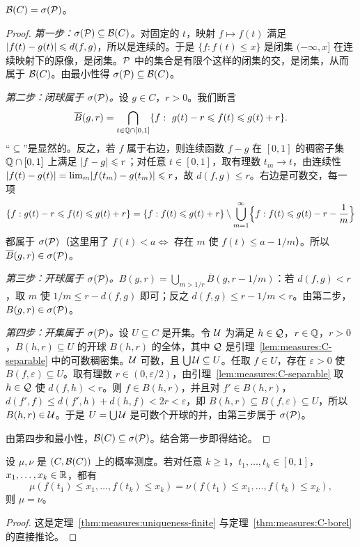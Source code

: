 \begin{theorem}\label{thm:measures:C-borel}
$\mathcal{B}(C)=\sigma(\mathcal{P})$。
\end{theorem}
\begin{proof}
\emph{第一步：$\sigma(\mathcal{P})\subseteq\mathcal{B}(C)$。}对固定的 $t$，映射 $f\mapsto f(t)$ 满足 $\lvert f(t)-g(t)\rvert\leqslant d(f,g)$，所以是连续的。于是 $\{f:f(t)\leqslant x\}$ 是闭集 $(-\infty,x]$ 在连续映射下的原像，是闭集。$\mathcal{P}$ 中的集合是有限个这样的闭集的交，是闭集，从而属于 $\mathcal{B}(C)$。由最小性得 $\sigma(\mathcal{P})\subseteq\mathcal{B}(C)$。

\emph{第二步：闭球属于 $\sigma(\mathcal{P})$。}设 $g\in C$，$r>0$。我们断言
\[
\overline B(g,r)=\bigcap_{t\in\mathbb{Q}\cap[0,1]}\{f:\ g(t)-r\leqslant f(t)\leqslant g(t)+r\}.
\]
“$\subseteq$”是显然的。反之，若 $f$ 属于右边，则连续函数 $f-g$ 在 $[0,1]$ 的稠密子集 $\mathbb{Q}\cap[0,1]$ 上满足 $\lvert f-g\rvert\leqslant r$；对任意 $t\in[0,1]$，取有理数 $t_m\to t$，由连续性 $\lvert f(t)-g(t)\rvert=\lim_m\lvert f(t_m)-g(t_m)\rvert\leqslant r$，故 $d(f,g)\leqslant r$。右边是可数交，每一项
\[
\{f: g(t)-r\leqslant f(t)\leqslant g(t)+r\}=\{f: f(t)\leqslant g(t)+r\}\setminus\bigcup_{m=1}^\infty\Bigl\{f: f(t)\leqslant g(t)-r-\frac1m\Bigr\}
\]
都属于 $\sigma(\mathcal{P})$（这里用了 $f(t)<a\iff$ 存在 $m$ 使 $f(t)\leqslant a-1/m$）。所以 $\overline B(g,r)\in\sigma(\mathcal{P})$。

\emph{第三步：开球属于 $\sigma(\mathcal{P})$。}$B(g,r)=\bigcup_{m>1/r}\overline B(g,r-1/m)$：若 $d(f,g)<r$，取 $m$ 使 $1/m\leqslant r-d(f,g)$ 即可；反之 $d(f,g)\leqslant r-1/m<r$。由第二步，$B(g,r)\in\sigma(\mathcal{P})$。

\emph{第四步：开集属于 $\sigma(\mathcal{P})$。}设 $U\subseteq C$ 是开集。令 $\mathcal{U}$ 为满足 $h\in\mathcal{Q}$，$r\in\mathbb{Q}$，$r>0$，$B(h,r)\subseteq U$ 的开球 $B(h,r)$ 的全体，其中 $\mathcal{Q}$ 是引理~\ref{lem:measures:C-separable} 中的可数稠密集。$\mathcal{U}$ 可数，且 $\bigcup\mathcal{U}\subseteq U$。任取 $f\in U$，存在 $\varepsilon>0$ 使 $B(f,\varepsilon)\subseteq U$。取有理数 $r\in(0,\varepsilon/2)$，由引理~\ref{lem:measures:C-separable} 取 $h\in\mathcal{Q}$ 使 $d(f,h)<r$。则 $f\in B(h,r)$，并且对 $f'\in B(h,r)$，$d(f',f)\leqslant d(f',h)+d(h,f)<2r<\varepsilon$，即 $B(h,r)\subseteq B(f,\varepsilon)\subseteq U$，所以 $B(h,r)\in\mathcal{U}$。于是 $U=\bigcup\mathcal{U}$ 是可数个开球的并，由第三步属于 $\sigma(\mathcal{P})$。

由第四步和最小性，$\mathcal{B}(C)\subseteq\sigma(\mathcal{P})$。结合第一步即得结论。
\end{proof}

\begin{corollary}\label{cor:measures:C-uniqueness}
设 $\mu,\nu$ 是 $(C,\mathcal{B}(C))$ 上的概率测度。若对任意 $k\geqslant1$，$t_1,\dots,t_k\in[0,1]$，$x_1,\dots,x_k\in\mathbb{R}$，都有
\[
\mu(f(t_1)\leqslant x_1,\dots,f(t_k)\leqslant x_k)=\nu(f(t_1)\leqslant x_1,\dots,f(t_k)\leqslant x_k),
\]
则 $\mu=\nu$。
\end{corollary}
\begin{proof}
这是定理~\ref{thm:measures:uniqueness-finite} 与定理~\ref{thm:measures:C-borel} 的直接推论。
\end{proof}

